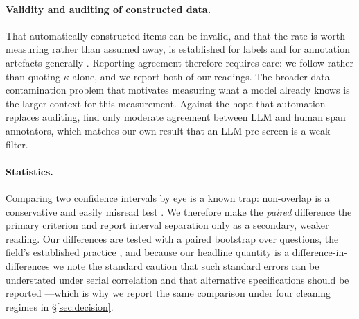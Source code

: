 \documentclass[11pt]{article}
\begin{document}
\paragraph{Validity and auditing of constructed data.}
That automatically constructed items can be invalid, and that the rate is worth
measuring rather than assumed away, is established for labels \citep{northcutt2021label}
and for annotation artefacts generally \citep{gururangan2018artifacts}. Reporting agreement
therefore requires care: we follow \citet{artstein2008kappa} rather than quoting $\kappa$
alone, and we report both of our readings. The broader data-contamination problem that
motivates measuring what a model already knows \citep{carlini2023} is the larger
context for this measurement. Against the hope that automation replaces auditing,
\citet{kasner2026span} find only moderate agreement between {LLM} and human
span annotators, which matches our own result that an {LLM} pre-screen is a
weak filter.

\paragraph{Statistics.}
Comparing two confidence intervals by eye is a known trap: non-overlap is a conservative
and easily misread test \citep{cumming2005inference}. We therefore make
the \emph{paired} difference the primary criterion and report interval separation only as a
secondary, weaker reading. Our differences are tested with a paired bootstrap over
questions, the field's established practice \citep{dror2018hitchhiker},
and because our headline quantity is a difference-in-differences we note the standard
caution that such standard errors can be understated under serial correlation and that
alternative specifications should be reported \citep{bertrand2004did}---which
is why we report the same comparison under four cleaning regimes in \S\ref{sec:decision}.
\end{document}
